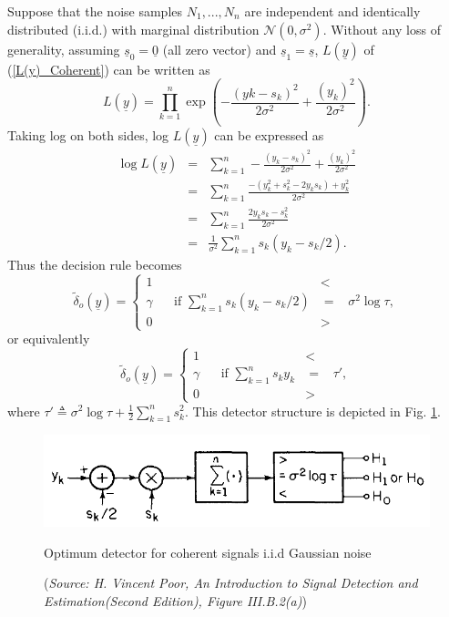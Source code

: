 \documentclass[a4paper,english,12pt]{article}
\begin{document}
\begin{exmp}
\label{caseI}
Suppose that the noise samples $N_{1},...,N_{n}$ are independent and identically distributed (i.i.d.) with marginal distribution $\mathcal{N}(0,\sigma^2)$. Without any loss of generality, assuming $\underline{s}_{0}= \underline{0}$ (all zero vector) and $\underline{s}_{1}= \underline{s}$, $L(\underline{y})$ of (\ref{L(y)_Coherent}) can be written as
\begin{equation}
L(\underline{y})=\prod_{k=1}^{n}\exp\left(-\frac{(y{k}-s_{k})^2}{2\sigma^2}+\frac{(y_{k})^2}{2\sigma^2}\right).
\end{equation}
Taking log on both sides, log $L(\underline{y})$ can be expressed as
\begin{eqnarray}
\log L(\underline{y})
  &=& \sum_{k=1}^{n}-\frac{(y_{k}-s_{k})^2}{2\sigma^2}+\frac{(y_{k})^2}{2\sigma^2} \nonumber\\
  &=& \sum_{k=1}^{n}\frac{-(y_{k}^2+s_{k}^2-2y_{k}s_{k})+y_{k}^2}{2\sigma^2} \nonumber\\
  &=& \sum_{k=1}^{n}\frac{2 y_{k} s_{k}-s_{k}^2 }{2\sigma^2} \nonumber\\
  &=& \frac {1}{\sigma^2}\sum_{k=1}^{n}s_{k}(y_{k}-s_{k}/2). 
\end{eqnarray}
Thus the decision rule becomes
\begin{equation}
{\tilde\delta_{o}(\underline{y})}= \begin{cases} 
1 &<\\
\gamma \hspace{20pt}\text{if }\sum_{k=1}^{n}s_{k}(y_{k}-s_{k}/2)&=\hspace{10pt}\sigma^2\log\tau,\\
0 &>
\end{cases}
\end{equation}
or equivalently
\begin{equation}
{\tilde\delta_{o}(\underline{y})}= \begin{cases} 
1 &<\\
\gamma \hspace{20pt}\text{if }\sum_{k=1}^{n}s_{k}y_{k}&=\hspace{10pt}\tau',\\
0 &>
\end{cases}
\end{equation}
where $\tau'\triangleq\sigma^2\log\tau+\frac{1}{2}\sum_{k=1}^{n}s_{k}^2$. This detector structure is depicted in Fig. \ref{fig:Fig1}.

\begin{figure}[h]
\centering
\captionsetup{justification=centering}
\includegraphics[width=0.8\linewidth]{Figures/lec10Fig1}
\caption{Optimum detector for coherent signals i.i.d Gaussian noise}
\caption*{\footnotesize(\textit{Source: H. Vincent Poor, An Introduction to Signal Detection and Estimation(Second Edition), Figure	 III.B.2(a)})}
\label{fig:Fig1}
\end{figure}



\end{exmp}
\end{document}
